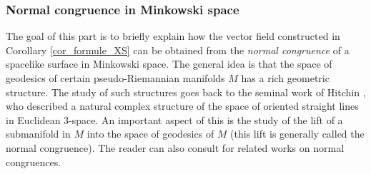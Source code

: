 \documentclass[11pt]{article}
\theoremstyle{plain}
\theoremstyle{definition}
\begin{document}
\subsubsection{Normal congruence in Minkowski space}
The goal of this part is to briefly explain how the vector field constructed in Corollary \ref{cor_formule_XS} can be obtained from the \emph{normal congruence} of a spacelike surface in Minkowski space. The general idea is that the space of geodesics of certain pseudo-Riemannian manifolds $M$ has a rich geometric structure. The study of such structures goes back to the seminal work of Hitchin \cite{Monopole_Hitchin}, who described a natural complex structure of the space of oriented straight lines in Euclidean $3$-space. An important aspect of this is the study of the lift of a submanifold in $M$ into the space of geodesics of $M$ (this lift is generally called the normal congruence). The reader can also consult \cite{ML_in_tangent_bundle, Anciaux_space_of_geodesic, Emam_Seppi1} for related works on normal congruences.
\end{document}
